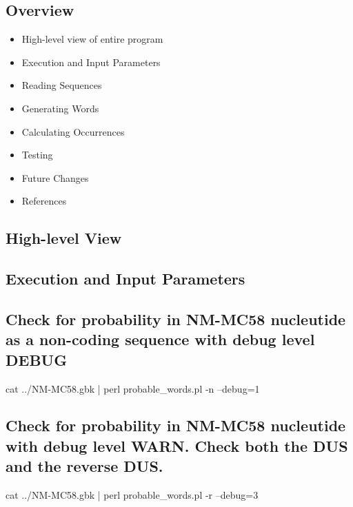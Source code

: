 \documentclass[12pt,notitlepage]{article}
\author{Leo Przybylski}
\begin{document}
  \W \begin{s5presentation}
  \maketitle

\begin{ifhtml}
    \begin{s5slide}
      \section{Overview}
      \begin{itemize}
      \item High-level view of entire program
      \item Execution and Input Parameters
      \item Reading Sequences
      \item Generating Words
      \item Calculating Occurrences
      \item Testing
      \item Future Changes
      \item References
      \end{itemize}
    \end{s5slide}

    \begin{s5slide}
      \section{High-level View}
    \end{s5slide}

    \begin{s5slide}
      \section{Execution and Input Parameters}
      \subsection{Check for probability in NM-MC58 nucleutide as a non-coding sequence with debug level DEBUG}
      cat ../NM-MC58.gbk | perl probable_words.pl -n --debug=1
      \subsection{Check for probability in NM-MC58 nucleutide with debug level WARN. Check both the DUS and the reverse DUS.}
      cat ../NM-MC58.gbk | perl probable_words.pl -r --debug=3

\end{s5slide}
\end{ifhtml}
\end{s5presentation}
\end{document}
